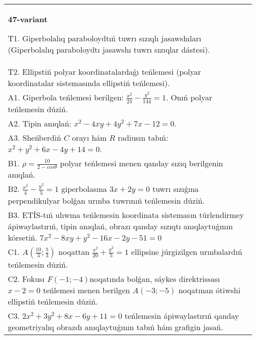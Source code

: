 \documentclass{article}
\begin{document}
\begin{tabular}{m{17cm}}
\textbf{47-variant}
\newline

T1. Giperbolalıq paraboloydtıń tuwrı sızıqlı jasawshıları (Giperbolalıq paraboloydtı jasawshı tuwrı sızıqlar dástesi).\\

T2. Ellipstiń polyar koordinatalardaǵı teńlemesi (polyar koordinatalar sistemasında ellipstiń teńlemesi).\\

A1. Giperbola teńlemesi berilgen: $\frac{x^{2}}{25}-\frac{y^{2}}{144}=1$. Onıń polyar teńlemesin dúziń.\\

A2. Tipin anıqlań: $x^{2}-4 xy+4 y^{2}+7 x-12=0$.\\

A3. Sheńberdiń $C$ orayı hám $R$ radiusın tabıń: $x^2+y^2+6 x-4 y+14=0$.\\

B1. $\rho = \frac{10}{2 - cos\theta}$ polyar teńlemesi menen qanday sızıq berilgenin anıqlań.  \\

B2. $\frac{x^{2}}{4} - \frac{y^{2}}{5} = 1$ giperbolasına $3x + 2y = 0$ tuwrı sızıǵına perpendikulyar bolǵan urınba tuwrınıń teńlemesin dúziń.\\

B3. ETİS-tıń ulıwma teńlemesin koordinata sistemasın túrlendirmey ápiwaylastırıń, tipin anıqlań, obrazı qanday sızıqtı anıqlaytuǵının kórsetiń. $7x^{2} - 8xy + y^{2} - 16x - 2y - 51 = 0$  \\

C1. $A(\frac{10}{3};\frac{5}{3})$ noqattan $\frac{x^{2}}{20} + \frac{y^{2}}{5} = 1$ ellipsine júrgizilgen urınbalardıń teńlemesin dúziń.  \\

C2. Fokusı $F( - 1; - 4)$noqatında bolǵan, sáykes direktrissası $x - 2 = 0$ teńlemesi menen berilgen $A( - 3; - 5)$ noqatınan ótiwshi ellipstiń teńlemesin dúziń.  \\

C3. $2x^{2} + 3y^{2} + 8x - 6y + 11 = 0$ teńlemesin ápiwaylastırıń qanday geometriyalıq obrazdı anıqlaytuǵının tabıń hám grafigin jasań.  \\

\end{tabular}
\vspace{1cm}
\end{document}
